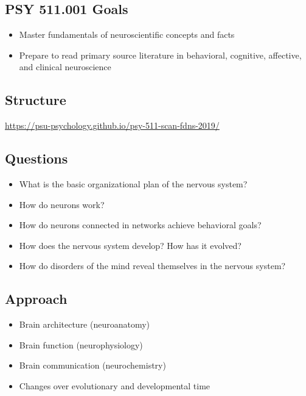 \documentclass[]{article}
\providecommand{\tightlist}{%
  \setlength{\itemsep}{0pt}\setlength{\parskip}{0pt}}
\begin{document}
\hypertarget{psy-511.001-goals}{%
\subsection{PSY 511.001 Goals}\label{psy-511.001-goals}}

\begin{itemize}
\tightlist
\item
  Master fundamentals of neuroscientific concepts and facts
\item
  Prepare to read primary source literature in behavioral, cognitive,
  affective, and clinical neuroscience
\end{itemize}

\hypertarget{structure}{%
\subsection{Structure}\label{structure}}

\url{https://psu-psychology.github.io/psy-511-scan-fdns-2019/}

\hypertarget{questions}{%
\subsection{Questions}\label{questions}}

\begin{itemize}
\tightlist
\item
  What is the basic organizational plan of the nervous system?
\item
  How do neurons work?
\item
  How do neurons connected in networks achieve behavioral goals?
\item
  How does the nervous system develop? How has it evolved?
\item
  How do disorders of the mind reveal themselves in the nervous system?
\end{itemize}

\hypertarget{approach}{%
\subsection{Approach}\label{approach}}

\begin{itemize}
\tightlist
\item
  Brain architecture (neuroanatomy)
\item
  Brain function (neurophysiology)
\item
  Brain communication (neurochemistry)
\item
  Changes over evolutionary and developmental time
\end{itemize}
\end{document}
